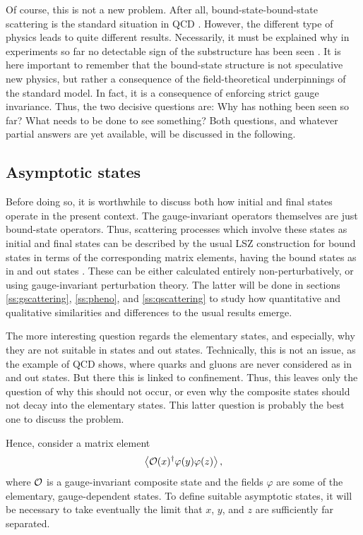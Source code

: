 \documentclass[final,12pt]{article}
\newcommand*{\no}{\noindent}
\newcommand*{\be}{\begin{equation}}
\newcommand*{\ee}{\end{equation}}
\newcommand*{\1}{1\!\!\!\bot}
\newcommand*{\la}{\left\langle}
\newcommand*{\ra}{\right\rangle}
\newcommand*{\op}{{\cal O}}
\begin{document}
Of course, this is not a new problem. After all, bound-state-bound-state scattering is the standard situation in QCD \cite{BeiglboCk:2006lfa,Bohm:2001yx,Dissertori:2003pj}. However, the different type of physics leads to quite different results. Necessarily, it must be explained why in experiments so far no detectable sign of the substructure has been seen \cite{pdg}. It is here important to remember that the bound-state structure is not speculative new physics, but rather a consequence of the field-theoretical underpinnings of the standard model. In fact, it is a consequence of enforcing strict gauge invariance. Thus, the two decisive questions are: Why has nothing been seen so far? What needs to be done to see something? Both questions, and whatever partial answers are yet available, will be discussed in the following.

\subsection{Asymptotic states}\label{ss:asymp}

Before doing so, it is worthwhile to discuss both how initial and final states operate in the present context. The gauge-invariant operators themselves are just bound-state operators. Thus, scattering processes which involve these states as initial and final states can be described by the usual LSZ construction for bound states in terms of the corresponding matrix elements, having the bound states as in and out states \cite{Alkofer:2000wg,Bohm:2001yx}. These can be either calculated entirely non-perturbatively, or using gauge-invariant perturbation theory. The latter will be done in sections \ref{ss:gscattering}, \ref{ss:pheno}, and \ref{ss:qscattering} to study how quantitative and qualitative similarities and differences to the usual results emerge.

The more interesting question regards the elementary states, and especially, why they are not suitable in states and out states. Technically, this is not an issue, as the example of QCD shows, where quarks and gluons are never considered as in and out states. But there this is linked to confinement. Thus, this leaves only the question of why this should not occur, or even why the composite states should not decay into the elementary states. This latter question is probably the best one to discuss the problem.

Hence, consider a matrix element
\be
\la \op(x)^\dagger\varphi(y)\varphi(z)\ra\label{decay},
\ee
\no where $\op$ is a gauge-invariant composite state and the fields $\varphi$ are some of the elementary, gauge-dependent states. To define suitable asymptotic states, it will be necessary to take eventually the limit that $x$, $y$, and $z$ are sufficiently far separated.
\end{document}
